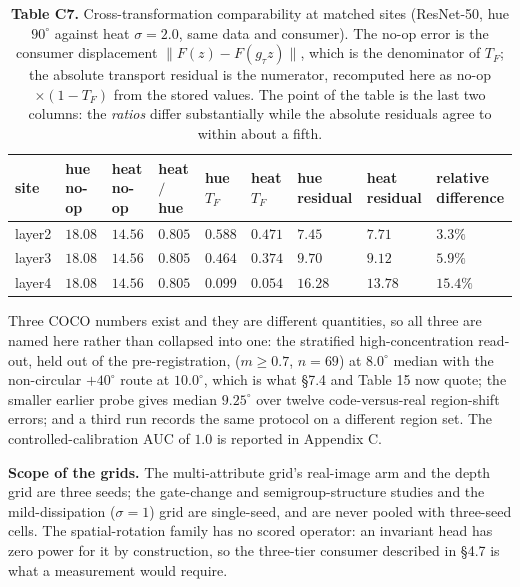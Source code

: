\begin{table}[t]
\centering
\tiny
\caption*{\textbf{Table C7.} Cross-transformation comparability at matched sites (ResNet-50, hue $90^\circ$ against heat $\sigma=2.0$, same data and consumer). The no-op error is the consumer displacement $\lVert F(z)-F(g_\tau z)\rVert$, which is the denominator of $T_F$; the absolute transport residual is the numerator, recomputed here as no-op $\times(1-T_F)$ from the stored values. The point of the table is the last two columns: the \textit{ratios} differ substantially while the absolute residuals agree to within about a fifth.}
\setlength{\tabcolsep}{2pt}
\begin{tabularx}{\textwidth}{@{}>{\raggedright\arraybackslash}X >{\raggedright\arraybackslash}X >{\raggedright\arraybackslash}X >{\raggedright\arraybackslash}X >{\raggedright\arraybackslash}X >{\raggedright\arraybackslash}X >{\raggedright\arraybackslash}X >{\raggedright\arraybackslash}X >{\raggedright\arraybackslash}X@{}}
\toprule
\textbf{site} & \textbf{hue no-op} & \textbf{heat no-op} & \textbf{heat $/$ hue} & \textbf{hue $T_F$} & \textbf{heat $T_F$} & \textbf{hue residual} & \textbf{heat residual} & \textbf{relative difference} \\
\midrule
layer2 & $18.08$ & $14.56$ & $0.805$ & $0.588$ & $0.471$ & $7.45$ & $7.71$ & $3.3\%$ \\
layer3 & $18.08$ & $14.56$ & $0.805$ & $0.464$ & $0.374$ & $9.70$ & $9.12$ & $5.9\%$ \\
layer4 & $18.08$ & $14.56$ & $0.805$ & $0.099$ & $0.054$ & $16.28$ & $13.78$ & $15.4\%$ \\
\bottomrule
\end{tabularx}
\end{table}

Three COCO numbers exist and they are different quantities, so all three are named here rather than collapsed into one: the stratified high-concentration read-out, held out of the pre-registration, ($m\ge0.7$, $n=69$) at $8.0^\circ$ median with the non-circular $+40^\circ$ route at $10.0^\circ$, which is what \S{}7.4 and Table 15 now quote; the smaller earlier probe gives median $9.25^\circ$ over twelve code-versus-real region-shift errors; and a third run records the same protocol on a different region set. The controlled-calibration AUC of $1.0$ is reported in Appendix C.

\textbf{Scope of the grids.} The multi-attribute grid's real-image arm and the depth grid are three seeds; the gate-change and semigroup-structure studies and the mild-dissipation ($\sigma=1$) grid are single-seed, and are never pooled with three-seed cells. The spatial-rotation family has no scored operator: an invariant head has zero power for it by construction, so the three-tier consumer described in \S{}4.7 is what a measurement would require.

